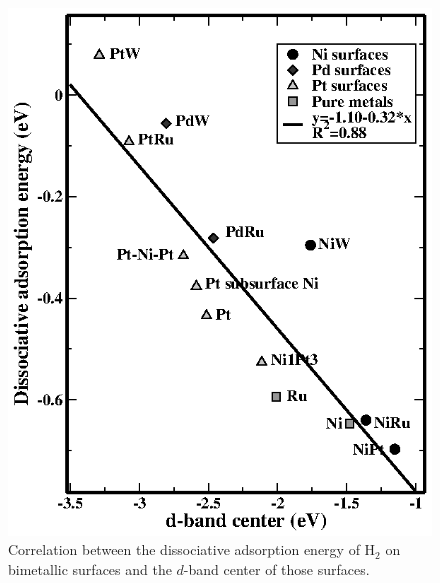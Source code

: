 \documentclass[aps,prl,twocolumn,superscriptaddress,showkeys]{revtex4}
\begin{document}
\begin{figure}
\includegraphics{Fig3}
\caption{Correlation between the dissociative adsorption energy of
  H$_2$ on bimetallic surfaces and the $d$-band center of those
  surfaces. \label{fig:HBE}}
\end{figure}
\end{document}
